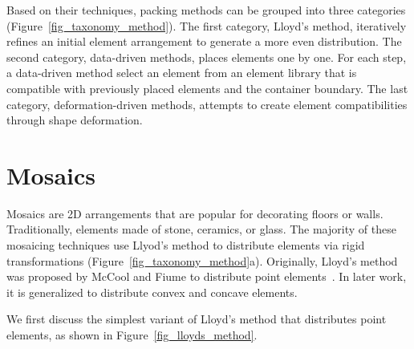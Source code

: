 \nnewtext
{
Based on their techniques, packing methods can be grouped into three categories (Figure~\ref{fig_taxonomy_method}).
The first category, Lloyd's method, iteratively refines an initial element arrangement to generate a more even distribution.
The second category, data-driven methods, places elements one by one. For each step, a data-driven method select 
an element from an element library that is compatible with previously placed elements and the container boundary.
The last category, deformation-driven methods, attempts to create element compatibilities through shape deformation.
}

\section{Mosaics}
\nnewtext
{
Mosaics are 2D arrangements that are popular for decorating floors or walls.
Traditionally, elements made of stone, ceramics, or glass.
The majority of these mosaicing techniques use Llyod's method to distribute elements
via rigid transformations (Figure~\ref{fig_taxonomy_method}a).
Originally, Lloyd's method was proposed by McCool and Fiume to distribute point elements~\cite{McCool1992}.
In later work, it is generalized to distribute convex and concave elements.
}

\nnewtext
{
We first discuss the simplest variant of Lloyd's method that distributes point elements, 
as shown in Figure~\ref{fig_lloyds_method}.}


